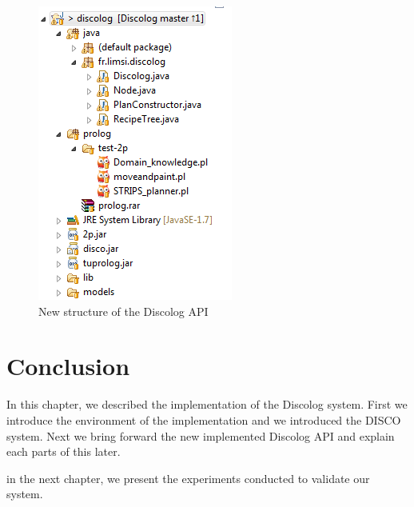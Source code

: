 		
		\begin{figure}[!h]
			\centering
			\includegraphics[width=.75\columnwidth]{Pictures/discologapi.png}
			\caption{\label{api} New structure of the Discolog API}
		\end{figure}
\section{Conclusion}

In this chapter, we described the implementation of the Discolog system. First we introduce the environment of the implementation and we introduced the DISCO system. Next we bring forward the new implemented Discolog API and explain each parts of this later.

in the next chapter, we present the experiments conducted to validate our system. 

